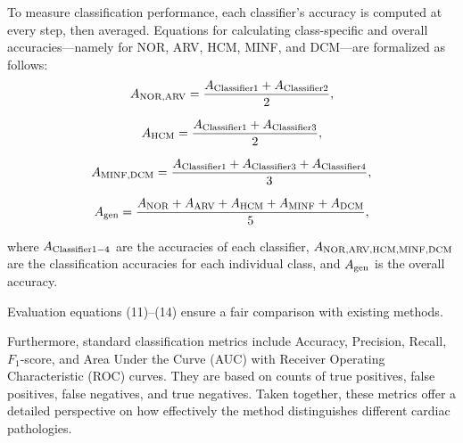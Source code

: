 \documentclass[fleqn,10pt]{wlscirep}
\begin{document}
To measure classification performance, each classifier’s accuracy is computed at every step, then averaged. Equations for calculating class-specific and overall accuracies—namely for NOR, ARV, HCM, MINF, and DCM—are formalized as follows:
\begin{equation}
    {A_{{\rm{NOR}}{\rm{,ARV}}}} = \frac{{{A_{{\rm{Classifier 1}}}} + {A_{{\rm{Classifier 2}}}}}}{2},
\end{equation}

\begin{equation}
    {A_{{\rm{HCM}}}} = \frac{{{A_{{\rm{Classifier 1}}}} + {A_{{\rm{Classifier 3}}}}}}{2},
\end{equation}

\begin{equation}
    {A_{{\rm{MINF}}{\rm{,DCM}}}} = \frac{{{A_{{\rm{Classifier 1}}}} + {A_{{\rm{Classifier 3}}}} + {A_{{\rm{Classifier 4}}}}}}{3},
\end{equation}

\begin{equation}
    {A_{{\rm{gen}}}} = \frac{{{A_{{\rm{NOR}}}} + {A_{{\rm{ARV}}}} + {A_{{\rm{HCM}}}} + {A_{{\rm{MINF}}}} + {A_{{\rm{DCM}}}}}}{5},
\end{equation}

where \({A_{{\rm{Classifier 1 - 4}}}}\) are the accuracies of each classifier, \({A_{{\rm{NOR}}{\rm{, ARV}}{\rm{, HCM}}{\rm{, MINF}}{\rm{, DCM}}}}\) are the classification accuracies for each individual class, and \({A_{{\rm{gen}}}}\) is the overall accuracy.

Evaluation equations (11)–(14) ensure a fair comparison with existing methods.

Furthermore, standard classification metrics include Accuracy, Precision, Recall, \({F_1}\)-score, and Area Under the Curve (AUC) with Receiver Operating Characteristic (ROC) curves. They are based on counts of true positives, false positives, false negatives, and true negatives. Taken together, these metrics offer a detailed perspective on how effectively the method distinguishes different cardiac pathologies.
\end{document}
